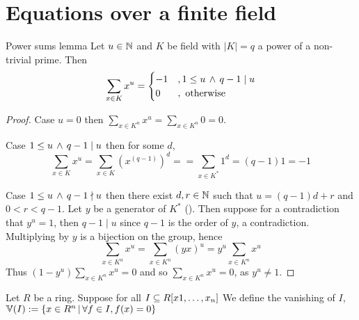\section{Equations over a finite field}
\begin{prop}{Power sums lemma}
    Let $u \in \mathbb{N}$ and $K$ be field with $|K| = q$ 
    a power of a non-trivial prime.
    Then 
    \[
        \sum_{x \in K} x^u = 
        \begin{cases}
            -1 &, 1 \le u \, \land \, q - 1 \mid u\\
            0 &, \text{ otherwise}
        \end{cases}
    \]
\end{prop}
\begin{proof}
    Case $u = 0$ then 
    $\sum_{x \in K^n} x^u = \sum_{x \in K^n} 0 = 0$.

    Case $1 \le u \, \land \, q - 1 \mid u$ then for some $d$,
    \[\sum_{x \in K} x^u = \sum_{x \in K} (x^(q-1))^d = 
     = \sum_{x \in K^*} 1^d = (q - 1) 1 = -1\]

    Case $1 \le u \, \land \, q - 1 \nmid u$ then there exist 
    $d, r \in \mathbb{N}$ such that $u = (q-1)d + r$ and $0 < r < q - 1$.
    Let $y$ be a generator of $K^*$ 
    ().
    Then suppose for a contradiction that $y^u = 1$,
    then $q - 1 \mid u$ since $q - 1$ is the order of $y$, 
    a contradiction.
    Multiplying by $y$ is a bijection on the group, 
    hence
    \[
        \sum_{x \in K^n} x^u = \sum_{x \in K^n} (yx)^u = 
        y^u \sum_{x \in K^n} x^u
    \]
    Thus $(1 - y^u) \sum_{x \in K^n} x^u = 0$ and so 
    $\sum_{x \in K^n} x^u = 0$, 
    as $y^u \ne 1$.
\end{proof}

\begin{dfn}[Vanishing]
    Let $R$ be a ring.
    Suppose for all $I \subseteq R[x1, \dots , x_n]$
    We define the vanishing of $I$, 
    $\mathbb{V}(I) := \{x \in R^n \,|\, \forall f \in I, f(x) = 0\}$
\end{dfn}

